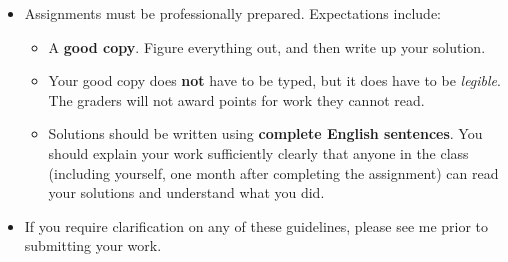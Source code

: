 \documentclass[letterpaper,12pt]{article}
\begin{document}
\begin{itemize}
 \item Assignments must be professionally prepared. Expectations include:
 \begin{itemize}
  \item A \textbf{good copy}. Figure everything out, and then write up your solution.
  \item Your good copy does \textbf{not} have to be typed, but it does have to be \textit{legible}. The graders will not award points for work they cannot read.
  \item Solutions should be written using \textbf{complete English sentences}. You should explain your work sufficiently clearly that anyone in the class (including yourself, one month after completing the assignment) can read your solutions and understand what you did.
 \end{itemize}
  \item If you require clarification on any of these guidelines, please see me prior to submitting your work.
\end{itemize}
\end{document}

